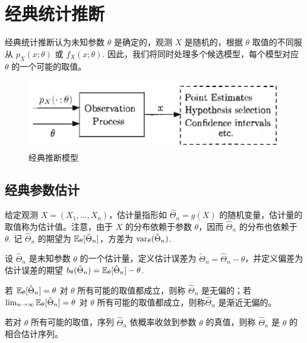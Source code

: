 \section{经典统计推断}

经典统计推断认为未知参数 $\theta$ 是确定的，观测 $X$ 是随机的，根据 $\theta$ 取值的不同服从 $p_X(x;\theta)$ 或 $f_X(x;\theta)$. 因此，我们将同时处理多个候选模型，每个模型对应 $\theta$ 的一个可能的取值。

\begin{figure}[H]
    \centering
    \includegraphics[width=0.5\linewidth]{figs/经典推断模型.png}
    \caption{经典推断模型}
    \label{fig:classical-inference}
\end{figure}


\subsection{经典参数估计}

\begin{definition}
给定观测 $X=(X_1,\ldots,X_n)$，估计量指形如 $\hat\Theta_n=g(X)$ 的随机变量，估计量的取值称为估计值。注意，由于 $X$ 的分布依赖于参数 $\theta$，因而 $\hat\Theta_n$ 的分布也依赖于 $\theta$. 记 $\hat\Theta_n$ 的期望为 $\mathbb{E}_\theta[\hat\Theta_n]$，方差为 $\mathrm{var}_\theta(\hat\Theta_n)$.
\end{definition}

\begin{definition}[估计误差，偏差]
设 $\hat\Theta_n$ 是未知参数 $\theta$ 的一个估计量，定义估计误差为 $\tilde\Theta_n=\hat\Theta_n-\theta$，并定义偏差为估计误差的期望 $b_\theta(\tilde\Theta_n)=\mathbb{E}_\theta[\hat\Theta_n]-\theta$.
\end{definition}

\begin{definition}[无偏，渐近无偏]
若 $\mathbb{E}_\theta[\hat\Theta_n]=\theta$ 对 $\theta$ 所有可能的取值都成立，则称 $\hat\Theta_n$ 是无偏的；若 $\lim_{n\to\infty}\mathbb{E}_\theta[\hat\Theta_n]=\theta$ 对 $\theta$ 所有可能的取值都成立，则称$\hat\Theta_n$ 是渐近无偏的。
\end{definition}

\begin{definition}[相合]
若对 $\theta$ 所有可能的取值，序列 $\hat\Theta_n$ 依概率收敛到参数 $\theta$ 的真值，则称 $\hat\Theta_n$ 是 $\theta$ 的相合估计序列。
\end{definition}

